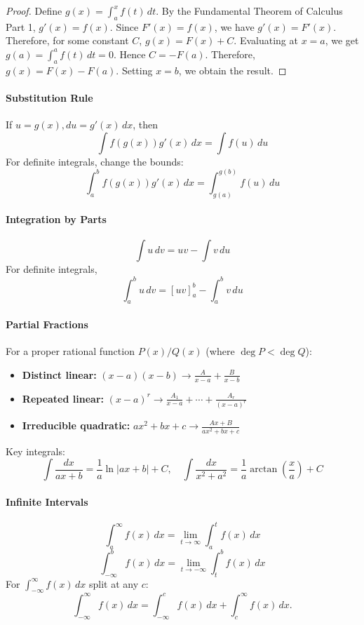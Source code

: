 \documentclass[oneside]{book}
\begin{document}

\begin{proof}
\noindent Define
$
    g(x)=\int_a^x f(t)\,dt.
$
By the Fundamental Theorem of Calculus Part 1,
$
    g'(x)=f(x).
$
Since \(F'(x)=f(x)\), we have
$
    g'(x)=F'(x).
$
Therefore, for some constant \(C\),
$
    g(x)=F(x)+C.
$
Evaluating at \(x=a\), we get
$
    g(a)=\int_a^a f(t)\,dt=0.
$
Hence
$
    C=-F(a).
$
Therefore,
$
    g(x)=F(x)-F(a).
$
Setting \(x=b\), we obtain the result. 
\end{proof}

\paragraph{Substitution Rule}
If $u=g(x), du=g'(x)\,dx$, then 
\[
\int f(g(x))g'(x)\,dx=\int f(u)\,du
\]
For definite integrals, change the bounds:
\[
\int_a^b f(g(x))g'(x)\,dx=\int_{g(a)}^{g(b)} f(u)\,du
\]

\paragraph{Integration by Parts}{
\[
\int u\,dv=uv-\int v\,du
\]
For definite integrals,
\[
\int_a^b u\,dv=[uv]_a^b-\int_a^b v\,du
\]
}

\paragraph{Partial Fractions}
For a proper rational function $P(x)/Q(x)$ (where $\deg P<\deg Q$):
\begin{itemize}
\item \textbf{Distinct linear:} $(x-a)(x-b) \to \frac{A}{x-a}+\frac{B}{x-b}$
\item \textbf{Repeated linear:} $(x-a)^r \to \frac{A_1}{x-a}+\cdots+\frac{A_r}{(x-a)^r}$
\item \textbf{Irreducible quadratic:} $ax^2+bx+c \to \frac{Ax+B}{ax^2+bx+c}$
\end{itemize}
Key integrals:
\[
\int \frac{dx}{ax+b}=\frac1a\ln|ax+b|+C, \quad \int \frac{dx}{x^2+a^2}=\frac1a\arctan\left(\frac xa\right)+C
\]

\paragraph{Infinite Intervals}
\[
\int_a^\infty f(x)\,dx=\lim_{t\to\infty}\int_a^t f(x)\,dx
\]
\[
\int_{-\infty}^b f(x)\,dx=\lim_{t\to-\infty}\int_t^b f(x)\,dx
\]
For $\int_{-\infty}^{\infty} f(x)\,dx$ split at any $c$:
\[
\int_{-\infty}^{\infty} f(x)\,dx=\int_{-\infty}^{c} f(x)\,dx+\int_c^\infty f(x)\,dx.
\]
\end{document}
